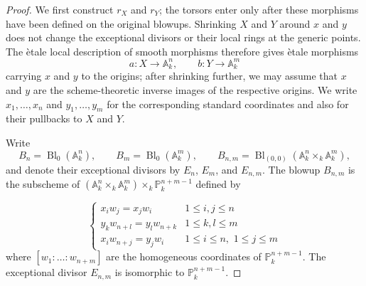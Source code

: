 \begin{proof}
We first construct $r_X$ and $r_Y$; the torsors enter only after these
morphisms have been defined on the original blowups. Shrinking $X$ and $Y$
around $x$ and $y$ does not change the exceptional divisors or their local
rings at the generic points. The \`etale local description of smooth
morphisms  therefore gives \`etale morphisms
\[
a:X\longrightarrow\mathbb A_k^n,
\qquad
b:Y\longrightarrow\mathbb A_k^m
\]
carrying $x$ and $y$ to the origins; after shrinking further, we may assume
that $x$ and $y$ are the scheme-theoretic inverse images of the respective
origins. We write $x_1,\ldots,x_n$ and $y_1,\ldots,y_m$ for the corresponding
standard coordinates and also for their pullbacks to $X$ and $Y$.

Write
\[
    B_n=\operatorname{Bl}_0(\mathbb A_k^n),\qquad
    B_m=\operatorname{Bl}_0(\mathbb A_k^m),\qquad
    B_{n,m}=\operatorname{Bl}_{(0,0)}
        (\mathbb A_k^n\times_k\mathbb A_k^m),
\]
and denote their exceptional divisors by $E_n$, $E_m$, and $E_{n,m}$.
The blowup $B_{n,m}$ is the subscheme of
$(\mathbb A_k^n\times_k\mathbb A_k^m)\times_k\mathbb P_k^{n+m-1}$ defined by

\[\begin{cases}
x_i w_j = x_j w_i & 1 \le i, j \le n \\
y_k w_{n+l} = y_l w_{n+k} & 1 \le k, l \le m \\
x_i w_{n+j} = y_j w_i & 1 \le i \le n, \,\, 1 \le j \le m
\end{cases}\]
where $[w_1:\dots:w_{n+m}]$ are the homogeneous coordinates of
$\mathbb P_k^{n+m-1}$. The exceptional divisor $E_{n,m}$ is
isomorphic to $\mathbb P_k^{n+m-1}$.


\end{proof}
